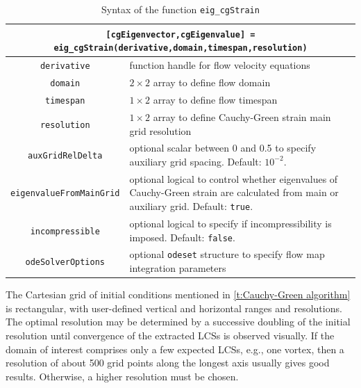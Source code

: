 \documentclass[5p]{elsarticle}
\begin{document}
\begin{table}
\begin{center}
\begin{tabular}{|c|p{}|}
\hline
\multicolumn{2}{|p{.95\textwidth}|}{\lstinline![cgEigenvector,cgEigenvalue] = eig_cgStrain(derivative,domain,timespan,resolution)!}\tabularnewline
\hline
\lstinline!derivative! & function handle for flow velocity equations\tabularnewline
\hline
\lstinline!domain! & $2 \times 2$ array to define flow domain\tabularnewline
\hline
\lstinline!timespan! & $1 \times 2$ array to define flow timespan\tabularnewline
\hline
\lstinline!resolution! & $1 \times 2$ array to define Cauchy-Green strain main grid resolution\tabularnewline
\hline
\lstinline!auxGridRelDelta! & optional scalar between 0 and 0.5 to specify auxiliary grid spacing. Default: $10^{-2}$.\tabularnewline
\hline
\lstinline!eigenvalueFromMainGrid! & optional logical to control whether eigenvalues of Cauchy-Green strain are calculated from main or auxiliary grid. Default: \lstinline!true!.\tabularnewline
\hline
\lstinline!incompressible! & optional logical to specify if incompressibility is imposed. Default: \lstinline!false!.\tabularnewline
\hline
\lstinline!odeSolverOptions! & optional \lstinline!odeset! structure to specify flow map integration parameters\tabularnewline
\hline
\end{tabular}
\caption{Syntax of the function \lstinline!eig_cgStrain!}
\label{t:eig_cgStrain syntax}
\end{center}
\end{table}

The Cartesian grid of initial conditions mentioned in \cref{t:Cauchy-Green algorithm} is rectangular, with user-defined vertical and horizontal ranges and resolutions. The optimal resolution may be determined by a successive doubling of the initial resolution until convergence of the extracted LCSs is observed visually. If the domain of interest comprises only a few expected LCSs, e.g., one vortex, then a resolution of about 500 grid points along the longest axis usually gives good results. Otherwise, a higher resolution must be chosen.
\end{document}
